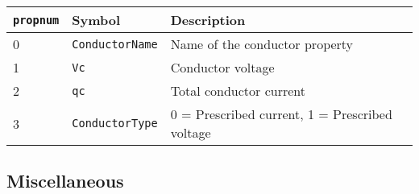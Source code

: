 \begin{itemize}
\begin{tabular}{lll}
\texttt{propnum} & Symbol & Description \\ \hline
  0 & \texttt{ConductorName} & Name of the conductor property \\
  1 & \texttt{Vc} &  Conductor voltage \\
  2 & \texttt{qc} &  Total conductor current \\
  3 & \texttt{ConductorType} & 0 = Prescribed current, 1 = Prescribed voltage
\end{tabular}

\end{itemize}

\subsection{Miscellaneous}

